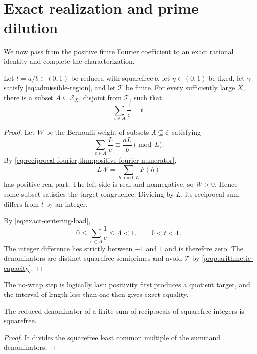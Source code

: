 \section{Exact realization and prime dilution}
\label{sec:exact-realization}

We now pass from the positive finite Fourier coefficient to an exact rational identity and complete the characterization.

\begin{theorem}
\label{thm:avoiding-fixed-target}
Let $t=a/b\in(0,1)$ be reduced with squarefree $b$, let $\eta\in(0,1)$ be fixed, let $\gamma$ satisfy \cref{eq:admissible-region}, and let $\mathcal T$ be finite. For every sufficiently large $X$, there is a subset $A\subseteq\mathcal E_X$, disjoint from $\mathcal T$, such that
\[
 \sum_{e\in A}\frac1e=t.
\]
\end{theorem}
\begin{proof}
Let $W$ be the Bernoulli weight of subsets $A\subseteq\mathcal E$ satisfying
\[
 \sum_{e\in A}\frac{L}{e}\equiv\frac{aL}{b}\pmod L.
\]
By \cref{eq:reciprocal-fourier,thm:positive-fourier-numerator},
\[
 LW=\sum_{h\bmod L}F(h)
\]
has positive real part. The left side is real and nonnegative, so $W>0$. Hence some subset satisfies the target congruence. Dividing by $L$, its reciprocal sum differs from $t$ by an integer.

By \cref{eq:exact-centering-load},
\[
 0\leq\sum_{e\in A}\frac1e\leq\Lambda<1,
 \qquad 0<t<1.
\]
The integer difference lies strictly between $-1$ and $1$ and is therefore zero. The denominators are distinct squarefree semiprimes and avoid $\mathcal T$ by \cref{prop:arithmetic-capacity}.
\end{proof}

The no-wrap step is logically last: positivity first produces a quotient target, and the interval of length less than one then gives exact equality.

\begin{lemma}
\label{lem:squarefree-necessity}
The reduced denominator of a finite sum of reciprocals of squarefree integers is squarefree.
\end{lemma}
\begin{proof}
It divides the squarefree least common multiple of the summand denominators.
\end{proof}

